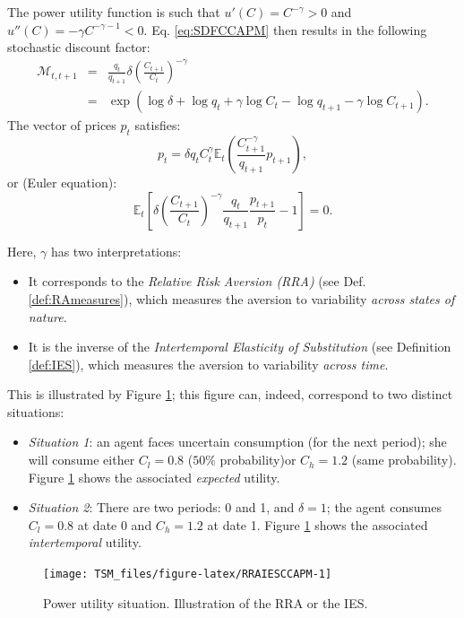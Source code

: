 \documentclass[
  12pt,
]{book}
\providecommand{\tightlist}{%
  \setlength{\itemsep}{0pt}\setlength{\parskip}{0pt}}
\theoremstyle{definition}
\theoremstyle{definition}
\theoremstyle{definition}
\theoremstyle{definition}
\theoremstyle{remark}
\begin{document}
The power utility function is such that \(u'(C) = C^{-\gamma} > 0\) and \(u''(C) = - \gamma C^{-\gamma-1} < 0\). Eq. \eqref{eq:SDFCCAPM} then results in the following stochastic discount factor:
\begin{eqnarray}
\mathcal{M}_{t,t+1} &=&  \frac{q_t}{q_{t+1}} \delta \left(
\frac{C_{t+1}}{C_t} \right)^{-\gamma} \nonumber\\
&=& \exp(\log
\delta + \log q_t + \gamma \log  C_t - \log  q_{t+1} - \gamma
\log  C_{t+1}).\label{eq:powerutilSDF}
\end{eqnarray}
The vector of prices \(p_t\) satisfies:
\[
p_t = \delta q_t C^\gamma_t \mathbb{E}_t \left(
\frac{C^{-\gamma}_{t+1}}{q_{t+1}} p_{t+1}
\right),
\]
or (Euler equation):
\begin{equation}
\mathbb{E}_t\left[
\delta\left(
\frac{C_{t+1}}{C_t}
\right)^{-\gamma}  \frac{q_t}{q_{t+1}}
\frac{p_{t+1}}{p_t} - 1
\right] = 0.\label{eq:EulerCCAPM}
\end{equation}

Here, \(\gamma\) has two interpretations:

\begin{itemize}
\tightlist
\item
  It corresponds to the \emph{Relative Risk Aversion (RRA)} (see Def. \ref{def:RAmeasures}), which measures the aversion to variability \emph{across states of nature}.
\item
  It is the inverse of the \emph{Intertemporal Elasticity of Substitution} (see Definition \ref{def:IES}), which measures the aversion to variability \emph{across time}.
\end{itemize}

This is illustrated by Figure \ref{fig:RRAIESCCAPM}; this figure can, indeed, correspond to two distinct situations:

\begin{itemize}
\tightlist
\item
  \emph{Situation 1}: an agent faces uncertain consumption (for the next period); she will consume either \(C_l= 0.8\) (\(50\%\) probability)or \(C_h= 1.2\) (same probability). Figure \ref{fig:RRAIESCCAPM} shows the associated \emph{expected} utility.
\item
  \emph{Situation 2}: There are two periods: 0 and 1, and \(\delta=1\); the agent consumes \(C_l=0.8\) at date 0 and \(C_h=1.2\) at date 1. Figure \ref{fig:RRAIESCCAPM} shows the associated \emph{intertemporal} utility.
\end{itemize}

\begin{figure}
\texttt{[image: TSM\_files/figure-latex/RRAIESCCAPM-1]} \caption{Power utility situation. Illustration of the RRA or the IES.}\label{fig:RRAIESCCAPM}
\end{figure}
\end{document}
